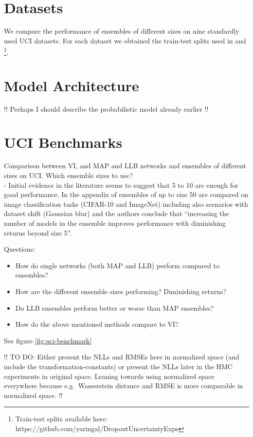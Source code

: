 \documentclass[../thesis.tex]{subfiles}
\begin{document}
\section{Datasets}
We compare the performance of ensembles of different sizes on nine standardly used UCI datasets. For each dataset we obtained the train-test splits used in \textcite{gal2016dropout} and \textcite{hernandez2015probabilistic}\footnote{Train-test splits available here: https://github.com/yaringal/DropoutUncertaintyExps}. 
\bigskip

\section{Model Architecture}
!! Perhaps I should describe the probabilistic model already earlier !!

\section{UCI Benchmarks}
Comparison between VI, and MAP and LLB networks and ensembles of different sizes on UCI. Which ensemble sizes to use? \\
- Initial evidence in the literature seems to suggest that 5 to 10 are enough for good performance. In the appendix of \textcite{ovadia2019can} ensembles of up to size 50 are compared on image classification tasks (CIFAR-10 and ImageNet) including also scenarios with dataset shift (Gaussian blur) and the authors conclude that ``increasing the number of models in the ensemble improves performance with diminishing returns beyond size 5''.
\bigskip

Questions:
\begin{itemize}
    \item How do single networks (both MAP and LLB) perform compared to ensembles?
    \item How are the different ensemble sizes performing? Diminishing returns?
    \item Do LLB ensembles perform better or worse than MAP ensembles?
    \item How do the above mentioned methods compare to VI?
\end{itemize}

See figure \ref{fig:uci-benchmark}

!! TO DO: Either present the NLLs and RMSEs here in normalized space (and include the transformation-constants) or present the NLLs later in the HMC experiments in original space. Leaning towards using normalized space everywhere because e.g.\ Wasserstein distance and RMSE is more comparable in normalized space. !!
\end{document}
